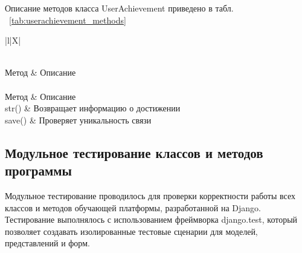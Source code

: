Описание методов класса UserAchievement приведено в табл. ~\ref {tab:userachievement_methods}

\begin{xltabular}{\textwidth}{|l|X|}
	\caption{Методы класса UserAchievement\label{tab:userachievement_methods}}\\
	\hline
	Метод & Описание \\ \hline
	\endfirsthead
	\\
	\hline
	Метод & Описание \\ \hline
	\endhead
	str() & Возвращает информацию о достижении \\ \hline
	save() & Проверяет уникальность связи \\ \hline
\end{xltabular}

\subsection{Модульное тестирование классов и методов программы}

Модульное тестирование проводилось для проверки корректности работы всех классов и методов обучающей платформы, разработанной на Django. Тестирование выполнялось с использованием фреймворка django.test, который позволяет создавать изолированные тестовые сценарии для моделей, представлений и форм.

